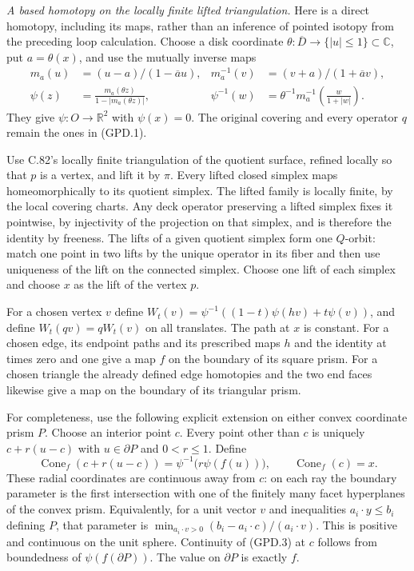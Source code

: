 \emph{A based homotopy on the locally finite lifted triangulation.}
Here is a direct homotopy, including its maps, rather than an
inference of pointed isotopy from the preceding loop calculation.
Choose a disk coordinate $\theta:\overline D\to\{|u|\leq1\}\subset
\mathbb C$, put $a=\theta(x)$, and use the mutually inverse maps
\[
 \begin{aligned}
 m_a(u)&=(u-a)/(1-\overline a u),
 &m_a^{-1}(v)&=(v+a)/(1+\overline a v),\\
 \psi(z)&=\frac{m_a(\theta z)}{1-|m_a(\theta z)|},
 &\psi^{-1}(w)&=\theta^{-1}m_a^{-1}\left(\frac{w}{1+|w|}\right).
 \end{aligned}                                                  \tag{GPD.2}
\]
They give $\psi:O\to\mathbb R^2$ with $\psi(x)=0$.
The original covering and every operator $q$ remain the ones in
(GPD.1).

Use C.82's locally finite triangulation of the quotient surface,
refined locally so that $p$ is a vertex, and lift it by $\pi$.
Every lifted closed simplex maps homeomorphically to its quotient
simplex. The lifted family is locally finite, by the local covering
charts. Any deck operator preserving a lifted simplex fixes it
pointwise, by injectivity of the projection on that simplex, and is
therefore the identity by freeness. The lifts of a given quotient
simplex form one $Q$-orbit: match one point in two lifts by the unique
operator in its fiber and then use uniqueness of the lift on the
connected simplex. Choose one lift of each simplex and choose $x$
as the lift of the vertex $p$.

For a chosen vertex $v$ define
$W_t(v)=\psi^{-1}((1-t)\psi(hv)+t\psi(v))$, and define
$W_t(qv)=qW_t(v)$ on all translates. The path at $x$ is constant.
For a chosen edge, its endpoint paths and its prescribed maps
$h$ and the identity at times zero and one give a map $f$ on the
boundary of its square prism. For a chosen triangle the already
defined edge homotopies and the two end faces likewise give a map
on the boundary of its triangular prism.

For completeness, use the following explicit extension on either
convex coordinate prism $P$. Choose an interior point $c$. Every
point other than $c$ is uniquely $c+r(u-c)$ with $u\in\partial P$
and $0<r\leq1$. Define
\[
 \operatorname{Cone}_f(c+r(u-c))
       =\psi^{-1}\bigl(r\psi(f(u))\bigr),
 \qquad \operatorname{Cone}_f(c)=x.                            \tag{GPD.3}
\]
These radial coordinates are continuous away from $c$: on each
ray the boundary parameter is the first intersection with one
of the finitely many facet hyperplanes of the convex prism.
Equivalently, for a unit vector $v$ and inequalities
$a_i\cdot y\leq b_i$ defining $P$, that parameter is
$\min_{a_i\cdot v>0}(b_i-a_i\cdot c)/(a_i\cdot v)$.
This is positive and continuous on the unit sphere.
Continuity of (GPD.3) at $c$ follows from boundedness of
$\psi(f(\partial P))$. The value on $\partial P$ is exactly $f$.

